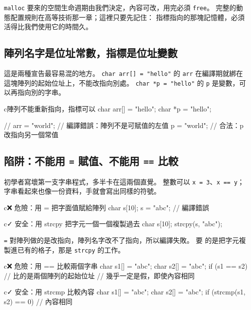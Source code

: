 \texttt{malloc} 要來的空間生命週期由我們決定，內容可改，用完必須
\texttt{free}。 完整的動態配置規則在高等技術那一章；這裡只要先記住：
指標指向的那塊記憶體，必須活得比我們使用它的時間久。

\subsection[陣列名字 vs 指標：常數與變數]{陣列名字是位址常數，指標是位址變數}

這是兩種宣告最容易混的地方。 \texttt{char arr[] = "hello"} 的
\texttt{arr} 在編譯期就綁在這塊陣列的起始位址上，不能改指向別處。
\texttt{char *p = "hello"} 的 \texttt{p} 是變數，可以再指向別的字串。

\begin{code}{c}{陣列不能重新指向，指標可以}
char arr[] = "hello";
char *p = "hello";

// arr = "world";   // 編譯錯誤：陣列不是可賦值的左值
p = "world";        // 合法：p 改指向另一個常值
\end{code}

\subsection[陷阱：別用 = 或 == 處理字串]{陷阱：不能用 \texttt{=} 賦值、不能用 \texttt{==} 比較}

初學者寫壞第一支字串程式，多半卡在這兩個直覺。 整數可以 \texttt{x =
3}、\texttt{x == y}；字串看起來也像一份資料，手就會寫出同樣的符號。

\begin{code}{c}{❌ 危險：用 = 把字面值賦給陣列}
char s[10];
s = "abc";    // 編譯錯誤
\end{code}

\begin{code}{c}{✓ 安全：用 strcpy 把字元一個一個複製過去}
char s[10];
strcpy(s, "abc");
\end{code}

\texttt{=} 對陣列做的是改指向，陣列名字改不了指向，所以編譯失敗。 要
的是把字元複製進已有的格子，那是 \texttt{strcpy} 的工作。

\begin{code}{c}{❌ 危險：用 == 比較兩個字串}
char s1[] = "abc";
char s2[] = "abc";
if (s1 == s2) {       // 比的是兩個陣列的起始位址
    // 幾乎一定是假，即使內容相同
}
\end{code}

\begin{code}{c}{✓ 安全：用 strcmp 比較內容}
char s1[] = "abc";
char s2[] = "abc";
if (strcmp(s1, s2) == 0) {
    // 內容相同
}
\end{code}

